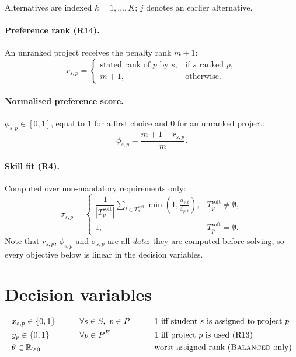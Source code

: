 \documentclass[11pt,a4paper]{article}
\newcommand{\soft}{\mathrm{soft}}
\begin{document}
\medskip\noindent
Alternatives are indexed $k = 1,\dots,K$; $j$ denotes an earlier alternative.

\paragraph{Preference rank (R14).} An unranked project receives the penalty rank $m+1$:
\begin{equation}
r_{s,p} =
\begin{cases}
\text{stated rank of } p \text{ by } s, & \text{if } s \text{ ranked } p,\\
m + 1, & \text{otherwise.}
\end{cases}
\end{equation}

\paragraph{Normalised preference score.} $\phi_{s,p} \in [0,1]$, equal to $1$ for a first choice and $0$ for an unranked project:
\begin{equation}
\phi_{s,p} = \frac{m + 1 - r_{s,p}}{m}.
\end{equation}

\paragraph{Skill fit (R4).} Computed over non-mandatory requirements only:
\begin{equation}
\sigma_{s,p} =
\begin{cases}
\dfrac{1}{|T_p^{\soft}|} \displaystyle\sum_{t \in T_p^{\soft}} \min\!\left(1, \frac{\alpha_{s,t}}{\beta_{p,t}}\right), & T_p^{\soft} \neq \emptyset,\\[2ex]
1, & T_p^{\soft} = \emptyset.
\end{cases}
\end{equation}
Note that $r_{s,p}$, $\phi_{s,p}$ and $\sigma_{s,p}$ are all \emph{data}: they are computed before solving, so every objective
below is linear in the decision variables.

\section{Decision variables}
\begin{alignat}{3}
& x_{s,p} \in \{0,1\} \qquad && \forall s \in S,\ p \in P \qquad && \text{1 iff student } s \text{ is assigned to project } p \\
& y_p \in \{0,1\} && \forall p \in P^{E} && \text{1 iff project } p \text{ is used (R13)} \\
& \theta \in \mathbb{R}_{\ge 0} && && \text{worst assigned rank (\textsc{Balanced} only)}
\end{alignat}
\end{document}
